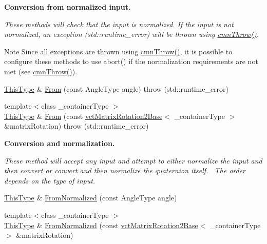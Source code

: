 \begin{Indent}{\bf Conversion from normalized input.}\par
{\em These methods will check that the input is normalized. If the input is not normalized, an exception ({\ttfamily std\+::runtime\+\_\+error}) will be thrown using \hyperlink{_minimal_cmn_8h_ad50e82cf9c9dbd0e6443c13e0d1a6f1a}{cmn\+Throw()}.

\begin{DoxyNote}{Note}
Since all exceptions are thrown using \hyperlink{_minimal_cmn_8h_ad50e82cf9c9dbd0e6443c13e0d1a6f1a}{cmn\+Throw()}, it is possible to configure these methods to use {\ttfamily abort()} if the normalization requirements are not met (see \hyperlink{_minimal_cmn_8h_ad50e82cf9c9dbd0e6443c13e0d1a6f1a}{cmn\+Throw()}). 
\end{DoxyNote}
}\begin{DoxyCompactItemize}
\item 
\hyperlink{classvct_angle_rotation2_a67339254f084f89c13aca70c1242d18e}{This\+Type} \& \hyperlink{classvct_angle_rotation2_a831a44a42d74add50de6b0cf38c13087}{From} (const Angle\+Type angle)  throw (std\+::runtime\+\_\+error)
\item 
{\footnotesize template$<$class \+\_\+container\+Type $>$ }\\\hyperlink{classvct_angle_rotation2_a67339254f084f89c13aca70c1242d18e}{This\+Type} \& \hyperlink{classvct_angle_rotation2_aa8de8e2af514ae8424db82f3ccb2225f}{From} (const \hyperlink{classvct_matrix_rotation2_base}{vct\+Matrix\+Rotation2\+Base}$<$ \+\_\+container\+Type $>$ \&matrix\+Rotation)  throw (std\+::runtime\+\_\+error)
\end{DoxyCompactItemize}
\end{Indent}
\begin{Indent}{\bf Conversion and normalization.}\par
{\em These method will accept any input and attempt to either normalize the input and then convert or convert and then normalize the quaternion itself.~\newline
The order depends on the type of input. }\begin{DoxyCompactItemize}
\item 
\hyperlink{classvct_angle_rotation2_a67339254f084f89c13aca70c1242d18e}{This\+Type} \& \hyperlink{classvct_angle_rotation2_ae7c2f016b94543789c29ad53cbf256b7}{From\+Normalized} (const Angle\+Type angle)
\item 
{\footnotesize template$<$class \+\_\+container\+Type $>$ }\\\hyperlink{classvct_angle_rotation2_a67339254f084f89c13aca70c1242d18e}{This\+Type} \& \hyperlink{classvct_angle_rotation2_a20529e684275cd15b864eab7984f69de}{From\+Normalized} (const \hyperlink{classvct_matrix_rotation2_base}{vct\+Matrix\+Rotation2\+Base}$<$ \+\_\+container\+Type $>$ \&matrix\+Rotation)
\end{DoxyCompactItemize}
\end{Indent}
